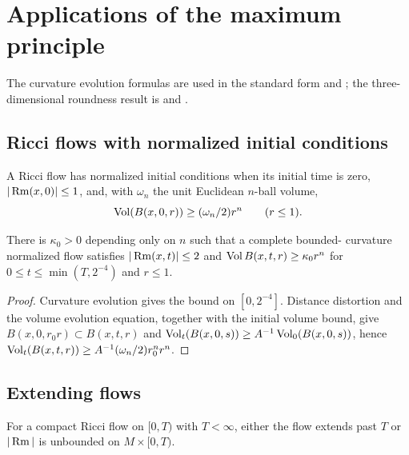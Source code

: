\section{Applications of the maximum principle}
The curvature evolution formulas are used in the standard form
\cite{ChowLuNi} and \cite{ChowLuNi}; the three-dimensional roundness result is
\cite{Hamilton3MPRC} and \cite{Hamilton3MPRC}.
\subsection{Ricci flows with normalized initial conditions}

\begin{definition}
\label{def:normalized-initial-conditions}


\label{norminitcond}
A Ricci flow has normalized initial conditions when its initial time is zero,
$|\operatorname{Rm}(x,0)|\le1$, and, with $\omega_n$ the unit Euclidean $n$-ball volume,
\[
\operatorname{Vol}(B(x,0,r))\ge(\omega_n/2)r^n\qquad (r\le1).
\]
\end{definition}

\begin{proposition}
\label{prop:normalized-flow-short-time-bounds}
\label{kappa0r0t0}
There is $\kappa_0>0$ depending only on $n$ such that a complete bounded-
curvature normalized flow satisfies $|\operatorname{Rm}(x,t)|\le2$ and
$\operatorname{Vol} B(x,t,r)\ge\kappa_0r^n$ for $0\le t\le\min(T,2^{-4})$ and $r\le1$.
\end{proposition}
\begin{proof}
\sketch Curvature evolution gives the bound on $[0,2^{-4}]$. Distance
distortion and the volume evolution equation, together with the initial
volume bound, give $B(x,0,r_0r)\subset B(x,t,r)$ and
$\operatorname{Vol}_t(B(x,0,s))\ge A^{-1}\operatorname{Vol}_0(B(x,0,s))$, hence
$\operatorname{Vol}_t(B(x,t,r))\ge A^{-1}(\omega_n/2)r_0^nr^n$.
\end{proof}

\subsection{Extending flows}
\begin{proposition}
\label{prop:ricci-flow-extension-criterion}
\label{flowextend}
For a compact Ricci flow on $[0,T)$ with $T<\infty$, either the flow extends
past $T$ or $|\operatorname{Rm}|$ is unbounded on $M\times[0,T)$.
\end{proposition}


